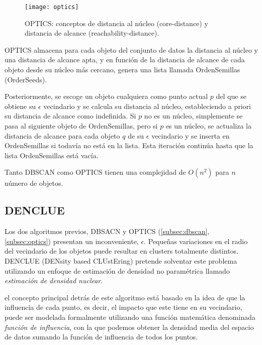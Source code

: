 \documentclass[10pt, a4paper]{article}
\begin{document}
\begin{figure}[ht]
\centering
\texttt{[image: optics]}
\caption{OPTICS: conceptos de distancia al núcleo (core-distance) y distancia de alcance (reachability-distance).}
\label{fig:optics}
\end{figure}

OPTICS almacena para cada objeto del conjunto de datos la distancia al núcleo y una distancia de alcance apta, y en función de la distancia de alcance de cada objeto desde su núcleo más cercano, genera una lista llamada OrdenSemillas (OrderSeeds). 

Posteriormente, se escoge un objeto cualquiera como punto actual $p$ del que se obtiene su $\epsilon$ vecindario y se calcula su distancia al núcleo, estableciendo a priori su distancia de alcance como indefinida. Si $p$ no es un núcleo, simplemente se pasa al siguiente objeto de OrdenSemillas, pero si $p$ es un núcleo, se actualiza la distancia de alcance para cada objeto $q$ de su $\epsilon$ vecindario y se inserta en OrdenSemillas si todavía no está en la lista. Esta iteración continúa hasta que la lista OrdenSemillas está vacía. 

Tanto DBSCAN como OPTICS tienen una complejidad de $O\left(n^2\right)$ para $n$ número de objetos.




\subsection{\textbf{DENCLUE}} \label{subsec:denclue}

Los dos algoritmos previos, DBSACN y OPTICS (\ref{subsec:dbscan}, \ref{subsec:optics}) presentan un inconveniente, $\epsilon$. Pequeñas variaciones en el radio del vecindario de los objetos puede resultar en clusters totalmente distintos. DENCLUE \cite{DENCLUE} (DENsity based CLUstEring) pretende solventar este problema utilizando un enfoque de estimación de densidad no paramétrica llamado \textit{estimación de densidad nuclear}.

el concepto principal detrás de este algoritmo está basado en la idea de que la influencia de cada punto, es decir, el impacto que este tiene en su vecindario, puede ser modelada formalmente utilizando una función matemática denominada \textit{función de influencia}, con la que podemos obtener la densidad media del espacio de datos sumando  la función de influencia de todos los puntos.
\end{document}
